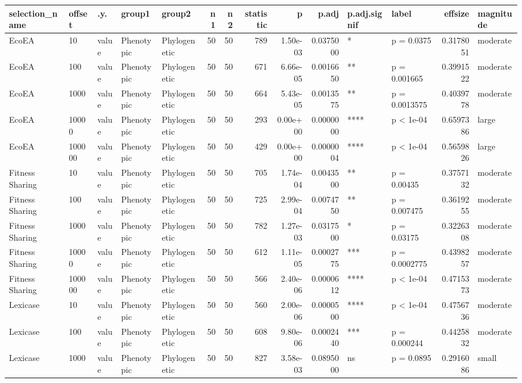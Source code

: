 \documentclass[]{book}
\begin{document}
\begin{table}
\centering
\begin{tabular}[t]{l|l|l|l|l|r|r|r|r|r|l|l|r|l}
\hline
selection\_name & offset & .y. & group1 & group2 & n1 & n2 & statistic & p & p.adj & p.adj.signif & label & effsize & magnitude\\
\hline
EcoEA & 10 & value & Phenotypic & Phylogenetic & 50 & 50 & 789 & 1.50e-03 & 0.0375000 & * & p = 0.0375 & 0.3178051 & moderate\\
\hline
EcoEA & 100 & value & Phenotypic & Phylogenetic & 50 & 50 & 671 & 6.66e-05 & 0.0016650 & ** & p = 0.001665 & 0.3991522 & moderate\\
\hline
EcoEA & 1000 & value & Phenotypic & Phylogenetic & 50 & 50 & 664 & 5.43e-05 & 0.0013575 & ** & p = 0.0013575 & 0.4039778 & moderate\\
\hline
EcoEA & 10000 & value & Phenotypic & Phylogenetic & 50 & 50 & 293 & 0.00e+00 & 0.0000000 & **** & p < 1e-04 & 0.6597386 & large\\
\hline
EcoEA & 100000 & value & Phenotypic & Phylogenetic & 50 & 50 & 429 & 0.00e+00 & 0.0000004 & **** & p < 1e-04 & 0.5659826 & large\\
\hline
Fitness Sharing & 10 & value & Phenotypic & Phylogenetic & 50 & 50 & 705 & 1.74e-04 & 0.0043500 & ** & p = 0.00435 & 0.3757132 & moderate\\
\hline
Fitness Sharing & 100 & value & Phenotypic & Phylogenetic & 50 & 50 & 725 & 2.99e-04 & 0.0074750 & ** & p = 0.007475 & 0.3619255 & moderate\\
\hline
Fitness Sharing & 1000 & value & Phenotypic & Phylogenetic & 50 & 50 & 782 & 1.27e-03 & 0.0317500 & * & p = 0.03175 & 0.3226308 & moderate\\
\hline
Fitness Sharing & 10000 & value & Phenotypic & Phylogenetic & 50 & 50 & 612 & 1.11e-05 & 0.0002775 & *** & p = 0.0002775 & 0.4398257 & moderate\\
\hline
Fitness Sharing & 100000 & value & Phenotypic & Phylogenetic & 50 & 50 & 566 & 2.40e-06 & 0.0000612 & **** & p < 1e-04 & 0.4715373 & moderate\\
\hline
Lexicase & 10 & value & Phenotypic & Phylogenetic & 50 & 50 & 560 & 2.00e-06 & 0.0000500 & **** & p < 1e-04 & 0.4756736 & moderate\\
\hline
Lexicase & 100 & value & Phenotypic & Phylogenetic & 50 & 50 & 608 & 9.80e-06 & 0.0002440 & *** & p = 0.000244 & 0.4425832 & moderate\\
\hline
Lexicase & 1000 & value & Phenotypic & Phylogenetic & 50 & 50 & 827 & 3.58e-03 & 0.0895000 & ns & p = 0.0895 & 0.2916086 & small\\

\end{tabular}
\end{table}
\end{document}
